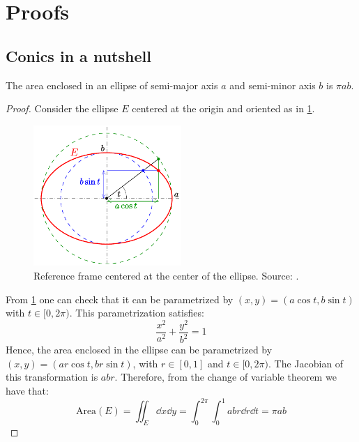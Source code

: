 \documentclass[../main.tex]{subfiles}
\begin{document}
\section{Proofs}\label{sec:proofs_appendix}
\subsection{Conics in a nutshell}
\begin{proposition}
  The area enclosed in an ellipse of semi-major axis $a$ and semi-minor axis $b$ is $\pi a b$.
\end{proposition}
\begin{proof}
  Consider the ellipse $E$ centered at the origin and oriented as in \cref{fig:circle-ellipse}.
  \begin{figure}[htbp]
    \centering
    \includegraphics[width=0.5\textwidth]{Images/circles-ellipse.pdf}
    \caption{Reference frame centered at the center of the ellipse. Source: \cite{wiki:conic-ellipse}.}
    \label{fig:circle-ellipse}
  \end{figure}

  From \cref{fig:circle-ellipse} one can check that it can be parametrized by $(x,y)=(a\cos t,b\sin t)$ with $ t\in[0,2\pi)$. This parametrization satisfies:
  \begin{equation}
    \frac{x^2}{a^2}+\frac{y^2}{b^2}=1
  \end{equation}
  Hence, the area enclosed in the ellipse can be parametrized by $(x, y)=(ar\cos t,br\sin t)$, with $r\in[0,1]$ and $t\in[0,2\pi)$. The Jacobian of this transformation is $abr$. Therefore, from the change of variable theorem we have that:
  \begin{equation}
    \mathrm{Area}(E)=\iint_E\dd{x}\dd{y}=\int_{0}^{2\pi}\int_{0}^{1}abr\dd{r}\dd{t}=\pi ab
  \end{equation}
\end{proof}
\end{document}
